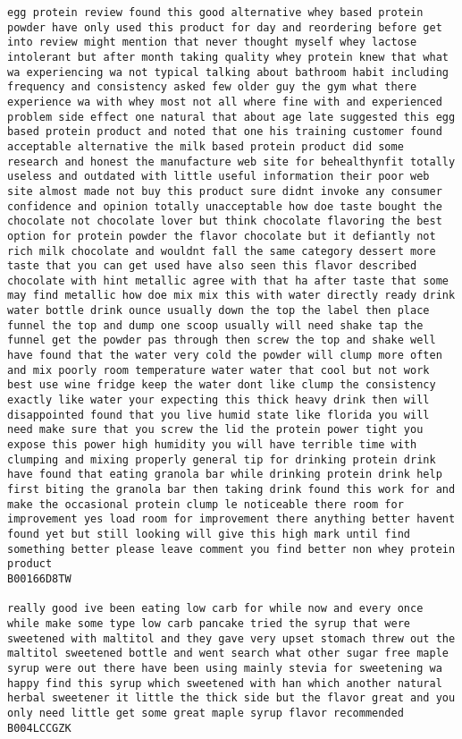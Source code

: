 \documentclass[11pt]{article}
\begin{document}
\begin{Verbatim}[commandchars=\\\{\}]
egg protein review found this good alternative whey based protein powder have only used this product for day and reordering before get into review might mention that never thought myself whey lactose intolerant but after month taking quality whey protein knew that what wa experiencing wa not typical talking about bathroom habit including frequency and consistency asked few older guy the gym what there experience wa with whey most not all where fine with and experienced problem side effect one natural that about age late suggested this egg based protein product and noted that one his training customer found acceptable alternative the milk based protein product did some research and honest the manufacture web site for behealthynfit totally useless and outdated with little useful information their poor web site almost made not buy this product sure didnt invoke any consumer confidence and opinion totally unacceptable how doe taste bought the chocolate not chocolate lover but think chocolate flavoring the best option for protein powder the flavor chocolate but it defiantly not rich milk chocolate and wouldnt fall the same category dessert more taste that you can get used have also seen this flavor described chocolate with hint metallic agree with that ha after taste that some may find metallic how doe mix mix this with water directly ready drink water bottle drink ounce usually down the top the label then place funnel the top and dump one scoop usually will need shake tap the funnel get the powder pas through then screw the top and shake well have found that the water very cold the powder will clump more often and mix poorly room temperature water water that cool but not work best use wine fridge keep the water dont like clump the consistency exactly like water your expecting this thick heavy drink then will disappointed found that you live humid state like florida you will need make sure that you screw the lid the protein power tight you expose this power high humidity you will have terrible time with clumping and mixing properly general tip for drinking protein drink have found that eating granola bar while drinking protein drink help first biting the granola bar then taking drink found this work for and make the occasional protein clump le noticeable there room for improvement yes load room for improvement there anything better havent found yet but still looking will give this high mark until find something better please leave comment you find better non whey protein product
B00166D8TW

really good ive been eating low carb for while now and every once while make some type low carb pancake tried the syrup that were sweetened with maltitol and they gave very upset stomach threw out the maltitol sweetened bottle and went search what other sugar free maple syrup were out there have been using mainly stevia for sweetening wa happy find this syrup which sweetened with han which another natural herbal sweetener it little the thick side but the flavor great and you only need little get some great maple syrup flavor recommended
B004LCCGZK


\end{Verbatim}
\end{document}
